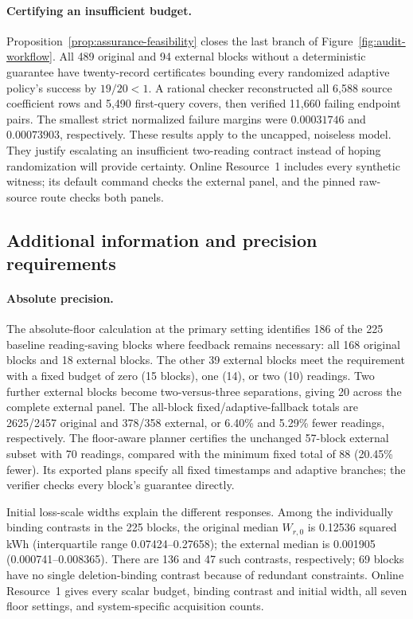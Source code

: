 \documentclass[12pt]{article}
\begin{document}
\paragraph{Certifying an insufficient budget.}
Proposition~\ref{prop:assurance-feasibility} closes the last branch of
Figure~\ref{fig:audit-workflow}. All 489 original and 94 external blocks
without a deterministic guarantee have twenty-record certificates bounding
every randomized adaptive policy's success by $19/20<1$. A rational checker
reconstructed all 6,588 source coefficient rows and 5,490 first-query covers,
then verified 11,660 failing endpoint pairs. The smallest strict normalized
failure margins were $0.00031746$ and $0.00073903$, respectively.
These results apply to the uncapped, noiseless model. They justify escalating
an insufficient two-reading contract instead of hoping randomization will
provide certainty. Online Resource~1 includes every synthetic witness; its
default command checks the external panel, and the pinned raw-source route
checks both panels.

\subsection{Additional information and precision requirements}
\paragraph{Absolute precision.}
The absolute-floor calculation at the primary setting identifies 186 of the 225 baseline
reading-saving blocks where feedback remains necessary: all 168 original
blocks and 18 external blocks. The other 39 external blocks meet the
requirement with a fixed budget of zero (15 blocks), one (14), or two (10)
readings. Two further external blocks become
two-versus-three separations, giving 20 across the complete external panel.
The all-block fixed/adaptive-fallback totals are 2625/2457 original and
378/358 external, or 6.40\% and 5.29\% fewer readings, respectively.
The floor-aware planner certifies the unchanged 57-block external subset
with 70 readings, compared with the minimum fixed total of 88 (20.45\%
fewer). Its exported plans specify all fixed timestamps and adaptive
branches; the verifier checks every block's guarantee directly.

Initial loss-scale widths explain the different responses. Among the
individually binding contrasts in the 225 blocks, the original median
$W_{r,0}$ is 0.12536 squared kWh (interquartile range 0.07424--0.27658);
the external median is 0.001905 (0.000741--0.008365).
There are 136 and 47 such contrasts, respectively; 69 blocks have no single
deletion-binding contrast because of redundant constraints.
Online Resource~1 gives every scalar budget, binding contrast and initial
width, all seven floor settings, and system-specific acquisition counts.
\end{document}
